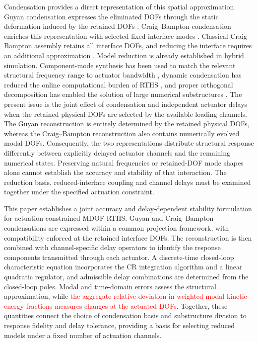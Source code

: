 \documentclass[a4paper,fleqn,review,12pt]{cas-sc}
\newcommand{\rev}[1]{\textcolor{red}{#1}}
\begin{document}
Condensation provides a direct representation of this spatial approximation. Guyan condensation expresses the eliminated DOFs through the static deformation induced by the retained DOFs \cite{Guyan1965}. Craig--Bampton condensation enriches this representation with selected fixed-interface modes \cite{Craig1968}. Classical Craig--Bampton assembly retains all interface DOFs, and reducing the interface requires an additional approximation \cite{Krattiger2019}. Model reduction is already established in hybrid simulation. Component-mode synthesis has been used to match the relevant structural frequency range to actuator bandwidth \cite{Miraglia2020}, dynamic condensation has reduced the online computational burden of RTHS \cite{Mucha2023}, and proper orthogonal decomposition has enabled the solution of large numerical substructures \cite{ZhangPOD2024}. The present issue is the joint effect of condensation and independent actuator delays when the retained physical DOFs are selected by the available loading channels. The Guyan reconstruction is entirely determined by the retained physical DOFs, whereas the Craig--Bampton reconstruction also contains numerically evolved modal DOFs. Consequently, the two representations distribute structural response differently between explicitly delayed actuator channels and the remaining numerical states. Preserving natural frequencies or retained-DOF mode shapes alone cannot establish the accuracy and stability of that interaction. The reduction basis, reduced-interface coupling and channel delays must be examined together under the specified actuation constraint.

This paper establishes a joint accuracy and delay-dependent stability formulation for actuation-constrained MDOF RTHS. Guyan and Craig--Bampton condensations are expressed within a common projection framework, with compatibility enforced at the retained interface DOFs. The reconstruction is then combined with channel-specific delay operators to identify the response components transmitted through each actuator. A discrete-time closed-loop characteristic equation incorporates the CR integration algorithm and a linear quadratic regulator, and admissible delay combinations are determined from the closed-loop poles. Modal and time-domain errors assess the structural approximation, while \rev{the aggregate relative deviation in weighted modal kinetic energy fractions measures changes at the actuated DOFs}. Together, these quantities connect the choice of condensation basis and substructure division to response fidelity and delay tolerance, providing a basis for selecting reduced models under a fixed number of actuation channels.
\end{document}
